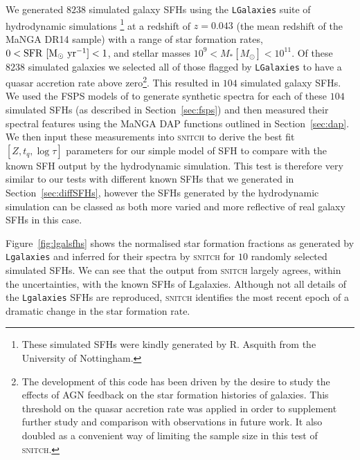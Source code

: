 \documentclass[useAMS,usenatbib]{mn2e}
\begin{document}
We generated $8238$ simulated galaxy SFHs using the \texttt{LGalaxies} suite of hydrodynamic simulations \citep{henriques15}\footnote{These simulated SFHs were kindly generated by R. Asquith from the University of Nottingham.} at a redshift of $z=0.043$ (the mean redshift of the MaNGA DR14 sample) with a range of star formation rates, $0 < \rm{SFR}~[M_{\odot}~\rm{yr}^{-1}] < 1$, and stellar masses $10^9 < M_{*} [M_{\odot}] < 10^{11}$. Of these $8238$ simulated galaxies we selected all of those flagged by \texttt{LGalaxies} to have a quasar accretion rate above zero\footnote{The development of this code has been driven by the desire to study the effects of AGN feedback on the star formation histories of galaxies. This threshold on the quasar accretion rate was applied in order to supplement further study and comparison with observations in future work. It also doubled as a convenient way of limiting the sample size in this test of \textsc{snitch}.}. This resulted in $104$ simulated galaxy SFHs. We used the FSPS models of \cite{conroy10} to generate synthetic spectra for each of these $104$ simulated SFHs (as described in Section~\ref{sec:fsps}) and then measured their spectral features using the MaNGA DAP functions outlined in Section~\ref{sec:dap}. We then input these measurements into \textsc{snitch} to derive the best fit $[Z, t_q, \log \tau]$ parameters for our simple model of SFH to compare with the known SFH output by the hydrodynamic simulation. This test is therefore very similar to our tests with different known SFHs that we generated in Section~\ref{sec:diffSFHs}, however the SFHs generated by the hydrodynamic simulation can be classed as both more varied and more reflective of real galaxy SFHs in this case.

Figure~\ref{fig:lgalsfhs} shows the normalised star formation fractions as generated by \texttt{Lgalaxies} and inferred for their spectra by \textsc{snitch} for $10$ randomly selected simulated SFHs. We can see that the output from \textsc{snitch} largely agrees, within the uncertainties, with the known SFHs of Lgalaxies. Although not all details of the \texttt{Lgalaxies} SFHs are reproduced, \textsc{snitch} identifies the most recent epoch of a dramatic change in the star formation rate.
\end{document}

